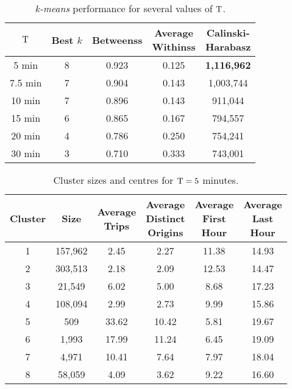 \begin{table}[t]
\centering
\tabcolsep=0.17cm
\begin{tabular}{c c c c c}
  \hline
$\mathrm{T}$ & Best $k$ & Betweenss & \thead{Average\\Withinss} & \thead{Calinski-\\Harabasz} \\
  \hline
5 min &   8 & 0.923 & 0.125 & \textbf{1,116,962} \\
  7.5 min &   7 & 0.904 & 0.143 & 1,003,744 \\
  10 min&   7 & 0.896 & 0.143 &   911,044 \\
  15 min &   6 & 0.865 & 0.167 &   794,557 \\
  20 min &   4 & 0.786 & 0.250 &   754,241 \\
  30 min &   3 & 0.710 & 0.333 &   743,001 \\
   \hline
\end{tabular}
\caption{\emph{k-means} performance for several values of $\mathrm{T}$.}
\label{t:tau_comparison}
\end{table}

\begin{table}[t]
\centering
\tabcolsep=0.15cm
\begin{tabular}{c c c c c c}
  \hline
 Cluster & Size & \thead{Average\\Trips} & \thead{Average\\Distinct\\Origins} & \thead{Average\\First\\Hour} & \thead{Average\\Last\\Hour} \\
  \hline
1 & 157,962 & 2.45 & 2.27 & 11.38 & 14.93 \\
  2 & 303,513 & 2.18 & 2.09 & 12.53 & 14.47 \\
  3 & 21,549 & 6.02 & 5.00 & 8.68 & 17.23 \\
  4 & 108,094 & 2.99 & 2.73 & 9.99 & 15.86 \\
  5 & 509 & 33.62 & 10.42 & 5.81 & 19.67 \\
  6 & 1,993 & 17.99 & 11.24 & 6.45 & 19.09 \\
  7 & 4,971 & 10.41 & 7.64 & 7.97 & 18.04 \\
  8 & 58,059 & 4.09 & 3.62 & 9.22 & 16.60 \\
   \hline
\end{tabular}
\caption{Cluster sizes and centres for $\mathrm{T} = 5$ minutes.}
\label{t:kmeans_centers_300}
\end{table}
